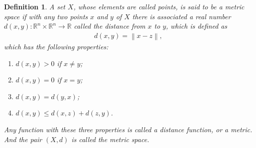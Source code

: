 \documentclass[11pt]{book}
\newtheorem{definition}{Definition}[chapter]
\theoremstyle{definition}
\numberwithin{equation}{chapter}
\begin{document}
\begin{definition}\label{def_19}
A set $X$, whose elements are called points, is said to be a metric space if with any two points $x$ and $y$ of $X$ there is associated a real number $d(x,y): \mathbb{R}^n \times \mathbb{R}^n \rightarrow \mathbb{R}$ called the distance from $x$ to $y$, which is defined as 
\begin{align*}
    d(x,y) = \left\|x - z\right\|,
\end{align*}
which has the following properties:
\begin{enumerate}[label=(\alph*)]
    \item $d(x,y) > 0$ if $x\neq y$;
    \item $d(x,y) = 0$ if $x = y$;
    \item $d(x,y) = d(y,x)$;
    \item $d(x,y) \leq d(x,z) + d(z,y)$.
\end{enumerate}
Any function with these three properties is called a distance function, or a metric. And the pair $(X,d)$ is called the metric space.
\end{definition}

\medskip
\end{document}
